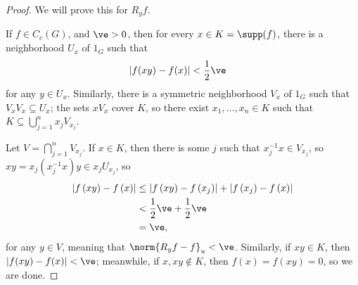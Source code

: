 \documentclass[10pt]{mypackage}
\begin{document}
\begin{proof}
  We will prove this for $R_yf$.\newline

  If $f\in C_c(G)$, and $\ve > 0$, then for every $x\in K = \supp(f)$, there is a neighborhood $U_x$ of $1_G$ such that
  \begin{align*}
    \left\vert f(xy) - f(x) \right\vert &< \frac{1}{2}\ve
  \end{align*}
  for any $y\in U_x$. Similarly, there is a symmetric neighborhood $V_x$ of $1_G$ such that $V_xV_x\subseteq U_x$; the sets $xV_x$ cover $K$, so there exist $x_1,\dots,x_n\in K$ such that $K\subseteq \bigcup_{j=1}^{n}x_jV_{x_j}$.\newline

  Let $V = \bigcap_{j=1}^{n}V_{x_j}$. If $x\in K$, then there is some $j$ such that $x_j^{-1}x\in V_{x_j}$, so $xy = x_j\left( x_{j}^{-1}x \right)y\in x_jU_{x_j}$, so
  \begin{align*}
    \left\vert f\left( xy \right) - f\left( x \right) \right\vert &\leq \left\vert f\left( xy \right) - f\left( x_j \right) \right\vert + \left\vert f\left( x_j \right) - f\left( x \right) \right\vert\\
                                                                  &< \frac{1}{2}\ve + \frac{1}{2}\ve\\
                                                                  &= \ve,
  \end{align*}
  for any $y\in V$, meaning that $\norm{R_yf-f}_{u} < \ve$. Similarly, if $xy\in K$, then $\left\vert f(xy) - f(x) \right\vert < \ve$; meanwhile, if $x,xy\notin K$, then $f(x) = f(xy) = 0$, so we are done.
\end{proof}
\end{document}
